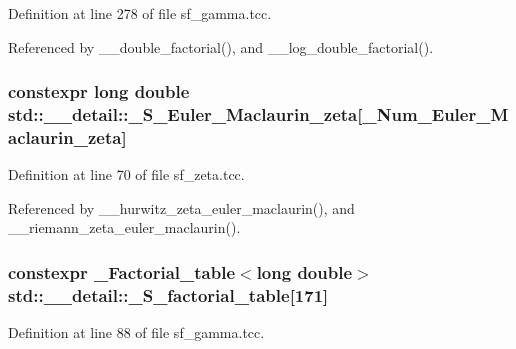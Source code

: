 Definition at line 278 of file sf\+\_\+gamma.\+tcc.



Referenced by \+\_\+\+\_\+double\+\_\+factorial(), and \+\_\+\+\_\+log\+\_\+double\+\_\+factorial().

\subsubsection[{\texorpdfstring{\+\_\+\+S\+\_\+\+Euler\+\_\+\+Maclaurin\+\_\+zeta}{_S_Euler_Maclaurin_zeta}}]{\setlength{\rightskip}{0pt plus 5cm}constexpr long double std\+::\+\_\+\+\_\+detail\+::\+\_\+\+S\+\_\+\+Euler\+\_\+\+Maclaurin\+\_\+zeta\mbox{[}{\bf \+\_\+\+Num\+\_\+\+Euler\+\_\+\+Maclaurin\+\_\+zeta}\mbox{]}}\hypertarget{namespacestd_1_1____detail_acd941b49595dd03e93c88107ad2f68c2}{}\label{namespacestd_1_1____detail_acd941b49595dd03e93c88107ad2f68c2}


Definition at line 70 of file sf\+\_\+zeta.\+tcc.



Referenced by \+\_\+\+\_\+hurwitz\+\_\+zeta\+\_\+euler\+\_\+maclaurin(), and \+\_\+\+\_\+riemann\+\_\+zeta\+\_\+euler\+\_\+maclaurin().

\subsubsection[{\texorpdfstring{\+\_\+\+S\+\_\+factorial\+\_\+table}{_S_factorial_table}}]{\setlength{\rightskip}{0pt plus 5cm}constexpr {\bf \+\_\+\+Factorial\+\_\+table}$<$long double$>$ std\+::\+\_\+\+\_\+detail\+::\+\_\+\+S\+\_\+factorial\+\_\+table\mbox{[}171\mbox{]}}\hypertarget{namespacestd_1_1____detail_a008b54abe31c1027aefdfd7a76a40e99}{}\label{namespacestd_1_1____detail_a008b54abe31c1027aefdfd7a76a40e99}


Definition at line 88 of file sf\+\_\+gamma.\+tcc.



